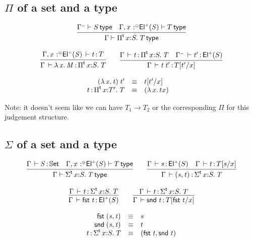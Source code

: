 \documentclass[11pt]{article}
\theoremstyle{plain}
\begin{document}
\subsection{$\Pi$ of a set and a type}

\[
\begin{array}{c}
\infer{\wftp{\Gamma}{\pitp{x}{S}{T}}}
      {\wftp{\Gamma^\con}{S} &
        \wftp{\Gamma, \vstptm {x}{\conc}{\Elp{S}}}{T}}
\\ \\
\infer{\oftp{\Gamma}{\ulam{x}{M}}{\pitp x {S} {T}}}
      {\oftp{\Gamma, \tptmv x {\conc} {\Elp{S}} }{t}{T}}
\qquad
\infer{\oftp{\Gamma}{\app t {t'}}{\subst T {t'} x}}
      {\oftp{\Gamma}{t}{\pitp{x}{S}{T}} &
        \oftp{\Gamma^\con}{t'}{\Elp{S}}}
\end{array}
\]

\[
\begin{array}{rcll}
\mathit{({\lambda\,x.\,t}) \: t'} & \equiv & t [ t' / x ] \\
t \, \mathit{:} \, \textnormal{$\Pi$}^{\mathsf{t}}\,x \mathit{:} T'.\,\mathit{T} & \equiv & {({\lambda\,x.\,t}{x})} &
\end{array} \\
\]

Note: it doesn't seem like we can have $T_1 \to T_2$ or the
corresponding $\Pi$ for this judgement structure.

\subsection{$\Sigma$ of a set and a type}

\[
\begin{array}{c}
\infer{\wftp{\Gamma}{\sigmatp{x}{S}{T}}}
      {\oftp{\Gamma}{S}{\types} &
        \wftp{\Gamma, \tptmv{x}{\coc}{\Elp{S}}}{T}}
\qquad
\infer{\oftp{\Gamma}{\pair{s}{t}}{\sigmatp x S T}}
      {\oftp{\Gamma}{s}{\Elp{S}} &
       \oftp{\Gamma}{t}{\subst{T}{s}x}}
\\ \\
\infer{\oftp{\Gamma}{\fst t}{\Elp{S}}}
      {\oftp{\Gamma}{t}{\sigmatp{x}{S}{T}}}
\qquad
\infer{\oftp{\Gamma}{\snd t}{\subst{T}{\fst t}{x}}}
      {\oftp{\Gamma}{t}{\sigmatp{x}{S}{T}}}
\end{array}
\]

\[
\begin{array}{rcll}
\mathit{\mathsf{fst}_{} \: \mathit{(s,t)_{}}} & \equiv & s \\
\mathit{\mathsf{snd}_{} \: \mathit{(s,t)_{}}} & \equiv & t \\
t \, \mathit{:} \, \textnormal{$\Sigma$}^{\mathsf{t}}\,x \mathit{:} S.\,\mathit{T} & \equiv & \mathit{(\mathit{\mathsf{fst}_{} \: t},\mathit{\mathsf{snd}_{} \: t})_{}}
\end{array}
\]
\end{document}

